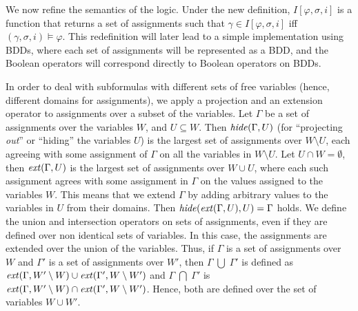 \fi

\iffalse
{}
We now refine the semantics of the logic. Under the new definition, 
$I [ \varphi , \sigma, i ]$ is a function that returns
a set of assignments such that $\gamma \in I [ \varphi , \sigma, i ]$ 
iff $( \gamma , \sigma , i ) \models \varphi$.
This redefinition will later lead to a simple implementation 
using BDDs, where each set of assignments will be represented
as a BDD, and the Boolean operators will correspond directly 
to Boolean operators on BDDs.

In order to deal with subformulas with different sets of free
variables (hence, different domains for assignments), 
we apply a projection and an extension operator to assignments
over a subset of the variables. Let $\Gamma$ be
a set of assignments over the variables $W$, and
$U \subseteq W$.
Then $\mathit{hide} ( \Gamma , U )$ (for ``projecting {\em out}'' or  ``hiding''
the variables $U$)
is the largest set of assignments over 
$W \setminus U$, 
each agreeing with some
assignment of $\Gamma$ on all the variables in $W \setminus U$.
Let $U \cap W = \emptyset$, then
$\mathit{ext} ( \Gamma , U )$ is the largest set of assignments
over $W \cup U$, where each such assignment agrees 
with some assignment in $\Gamma$ on the
values assigned to the variables $W$. 
This means that we extend $\Gamma$ by
adding arbitrary values to the variables in $U$ from their domains.
Then $\mathit{hide} ( \mathit{ext} ( \Gamma , U ) , U ) = \Gamma$ holds.
We define the union and intersection operators on sets of
assignments, even if they are defined over non identical
sets of variables. 
In this case, the assignments are extended
over the union of the variables. Thus, if $\Gamma$ is a
set of assignments over $W$ and $\Gamma'$ is
a set of assignments over $W'$, then
$\Gamma \; \bigcup \;  \Gamma'$ is defined as $\mathit{ext} (\Gamma , W' \setminus W ) \cup
\mathit{ext} ( \Gamma' , W \setminus W' )$ and
$\Gamma \; \bigcap \; \Gamma'$ is $\mathit{ext} (\Gamma , W' \setminus W ) \cap
\mathit{ext} ( \Gamma' , W \setminus W' )$.  Hence, both are defined
over the set of variables $W \cup W'$.





